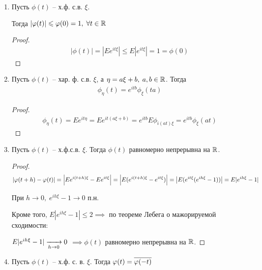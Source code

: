 
\begin{enumerate}[label=\protect\circled{\arabic*},series=charfunc_properties]
  \item
    Пусть $\phi(t)$ -- х.ф. с.в. $\xi$. 

    Тогда $|\varphi(t)| \leqslant \varphi(0) = 1, \; \forall t \in \mathbb{R}$
    \begin{proof}
      \begin{align*}
        |\phi(t)| = |E e^{i t \xi}| \leq E |e^{i t \xi}| = 1 = \phi(0)
      \end{align*}
    \end{proof}

  \item 
    Пусть $\phi(t)$ -- хар. ф. с.в. $\xi$, а $\eta = a \xi + b, \; a, b \in \mathbb{R}$.
    Тогда
    \begin{align*}
      \phi_{\eta} (t) = e^{i t b} \phi_{\xi} (t a)
    \end{align*}

    \begin{proof}
      \begin{align*}
        \phi_{\eta} (t) = E e^{i t \eta} = E e^{i t (a \xi + b)} 
        = e^{i t b} E \phi_{i (a t) \xi} = e^{i t b} \phi_\xi (at)
      \end{align*}
    \end{proof}

  \item
    Пусть $\phi(t)$ -- х.ф.с.в. $\xi$. 
    Тогда $\phi(t)$ равномерно непрерывна на $\mathbb{R}$.

    \begin{proof}
      \begin{align*}
        |\varphi(t + h) - \varphi(t)| = \left | E e^{i (t + h) \xi} - E e^{i t \xi} \right | 
        = \left | E(e^{i(t + h)\xi} - e^{i t \xi}) \right | = \left | E(e^{i t \xi} (e^{i h \xi} - 1)) \right |
        = E |e^{i h \xi} - 1|
      \end{align*}
      
      При $h \to 0, \; e^{i h \xi} - 1 \to 0$ п.н. 

      Кроме того, $E|e^{i h \xi} - 1| \leq 2 \implies$
      по теореме Лебега о мажорируемой сходимости:

      $E|e^{i h \xi} - 1| \xrightarrow[h \to 0]{} 0$ 
      $\implies \phi(t)$  равномерно непрерывна на $\mathbb{R}$.
    \end{proof}

  \item
    Пусть $\phi(t)$ -- х.ф. с. в. $\xi$. Тогда $\varphi(t) = \overline{\varphi(-t)}$


\end{enumerate}
